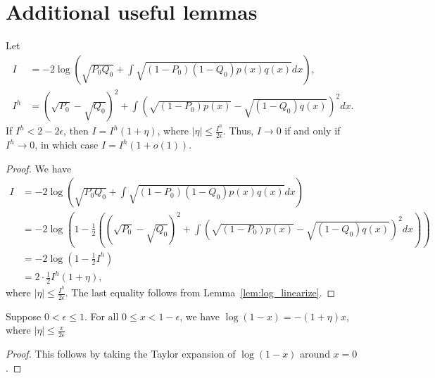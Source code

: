 \documentclass{article}
\begin{document}

\section{Additional useful lemmas}



\begin{lemma}
\label{lem:renyi_hellinger}
Let
\begin{align*}
I & = -2 \log \left( \sqrt{P_0 Q_0} + \int \sqrt{(1-P_0)(1-Q_0) p(x) q(x)} dx \right), \\
%
I^{h} & = (\sqrt{P_0} - \sqrt{Q_0})^2 + \int \left( \sqrt{ (1-P_0) p(x)} - \sqrt{ (1-Q_0) q(x)} \right)^2 dx.
\end{align*}
If $I^h < 2 - 2\epsilon$, then $I = I^h(1+\eta)$, where $|\eta| \leq \frac{I^h}{2\epsilon}$. Thus, $I \rightarrow 0$ if and only if $I^h \rightarrow 0$, in which case $I = I^h(1+o(1))$.

\end{lemma}

\begin{proof}
We have
\begin{align*}
I &= -2 \log \left( \sqrt{P_0 Q_0} + \int \sqrt{(1-P_0)(1-Q_0) p(x) q(x)} dx \right) \\
  &= -2 \log \left( 1 - \frac{1}{2} \left( 
                (\sqrt{P_0} - \sqrt{Q_0})^2 + 
               \int (\sqrt{(1-P_0)p(x)} - \sqrt{(1-Q_0)q(x)} )^2 dx \right) \right)\\
 &= -2 \log \left(1 - \frac{1}{2} I^h \right) \\
  &= 2 \cdot \frac{1}{2} I^h (1 + \eta),
\end{align*}
where $|\eta| \leq \frac{I^h}{2 \epsilon}$. The last equality follows from Lemma~\ref{lem:log_linearize}.
\end{proof}

\begin{lemma}
\label{lem:log_linearize}
Suppose $0 < \epsilon \le 1$. For all $0 \leq x < 1-\epsilon$, we have $\log (1 - x) = - (1 + \eta) x$, where $| \eta| \leq \frac{x}{2 \epsilon}$
\end{lemma}

\begin{proof}
This follows by taking the Taylor expansion of $\log (1 - x)$ around $x = 0$.
\end{proof}
\end{document}
